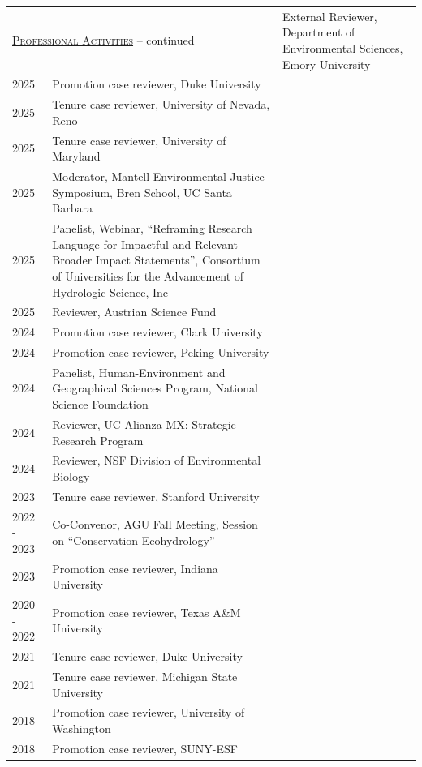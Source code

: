
\begin{longtable}{l p{5.5in}}

\endfirsthead
\multicolumn{2}{l}{\hspace{.1in} \textsc{\underline{Professional Activities}} -- continued
\vspace*{.1in} }  \endhead

2026 & External Reviewer, Department of Environmental Sciences, Emory University \\
2025 & Promotion case reviewer, Duke University \\
2025 & Tenure case reviewer, University of Nevada, Reno \\
2025 & Tenure case reviewer, University of Maryland \\
2025 & Moderator, Mantell Environmental Justice Symposium, Bren School, UC Santa Barbara  \\
2025 & Panelist, Webinar, ``Reframing Research Language for Impactful and Relevant Broader Impact Statements'', Consortium of Universities for the Advancement of Hydrologic Science, Inc \\
2025 & Reviewer, Austrian Science Fund \\
2024 & Promotion case reviewer, Clark University \\
2024 & Promotion case reviewer, Peking University \\
2024 & Panelist, Human-Environment and Geographical Sciences Program, National Science Foundation \\
2024 & Reviewer, UC Alianza MX: Strategic Research Program \\
2024 & Reviewer, NSF Division of Environmental Biology \\
2023 & Tenure case reviewer, Stanford University \\
2022 - 2023 & Co-Convenor, AGU Fall Meeting, Session on ``Conservation Ecohydrology'' \\
2023 & Promotion case reviewer, Indiana University \\
2020 - 2022 & Promotion case reviewer, Texas A\&M University \\
2021 & Tenure case reviewer, Duke University \\
2021 & Tenure case reviewer, Michigan State University \\
2018 & Promotion case reviewer, University of Washington \\
2018 & Promotion case reviewer, SUNY-ESF \\

\end{longtable}
